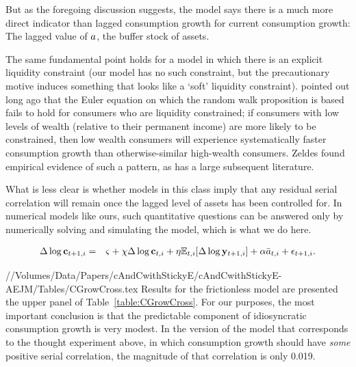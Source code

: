 \documentclass[titlepage]{./econtex}
\begin{document}
But as the foregoing discussion suggests, the model says there is a much more direct indicator than lagged consumption growth for current consumption growth:  The lagged value of $a$, the buffer stock of assets.

The same fundamental point holds for a model in which there is an explicit liquidity constraint (our model has no such constraint, but the precautionary motive induces something that looks like a `soft' liquidity constraint).  \cite{zeldes:jpe} pointed out long ago that the Euler equation on which the random walk proposition is based fails to hold for consumers who are liquidity constrained; if consumers with low levels of wealth (relative to their permanent income) are more likely to be constrained, then low wealth consumers will experience systematically faster consumption growth than otherwise-similar high-wealth consumers.  Zeldes found empirical evidence of such a pattern, as has a large subsequent literature.

What is less clear is whether models in this class imply that any residual serial correlation will remain once the lagged level of assets has been controlled for.  In numerical models like ours, such quantitative questions can be answered only by numerically solving and simulating the model, which is what we do here.

 \begin{eqnarray*}
\Delta \log \mathbf{c} _{t+1,i} &=& \varsigma + \chi \Delta \log \mathbf{c} _{t,i} + \eta {\operatorname{\mathbb{E}}}_{t,i}[\Delta \log \mathbf{y} _{t+1,i}]+ {\alpha} \bar{a}_{t,i}+\epsilon_{t+1,i}.
\end{eqnarray*}

//Volumes/Data/Papers/cAndCwithStickyE/cAndCwithStickyE-AEJM/Tables/CGrowCross.tex
Results for the frictionless model are presented the upper panel of Table~\ref{table:CGrowCross}.
For our purposes, the most important conclusion is that the predictable component of idiosyncratic consumption growth is very modest.  In the version of the model that corresponds to the thought experiment above, in which consumption growth should have {\it some} positive serial correlation, the magnitude of that correlation is only 0.019. 
\end{document}
